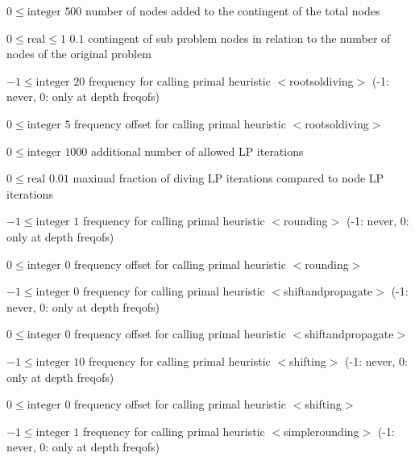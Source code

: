 %
{$0\leq\textrm{integer}$}%
{$500$}%
{number of nodes added to the contingent of the total nodes}%
{}

%
{$0\leq\textrm{real}\leq1$}%
{$0.1$}%
{contingent of sub problem nodes in relation to the number of nodes of the original problem}%
{}

%
{$-1\leq\textrm{integer}$}%
{$20$}%
{frequency for calling primal heuristic $<$rootsoldiving$>$ (-1: never, 0: only at depth freqofs)}%
{}

%
{$0\leq\textrm{integer}$}%
{$5$}%
{frequency offset for calling primal heuristic $<$rootsoldiving$>$}%
{}

%
{$0\leq\textrm{integer}$}%
{$1000$}%
{additional number of allowed LP iterations}%
{}

%
{$0\leq\textrm{real}$}%
{$0.01$}%
{maximal fraction of diving LP iterations compared to node LP iterations}%
{}

%
{$-1\leq\textrm{integer}$}%
{$1$}%
{frequency for calling primal heuristic $<$rounding$>$ (-1: never, 0: only at depth freqofs)}%
{}

%
{$0\leq\textrm{integer}$}%
{$0$}%
{frequency offset for calling primal heuristic $<$rounding$>$}%
{}

%
{$-1\leq\textrm{integer}$}%
{$0$}%
{frequency for calling primal heuristic $<$shiftandpropagate$>$ (-1: never, 0: only at depth freqofs)}%
{}

%
{$0\leq\textrm{integer}$}%
{$0$}%
{frequency offset for calling primal heuristic $<$shiftandpropagate$>$}%
{}

%
{$-1\leq\textrm{integer}$}%
{$10$}%
{frequency for calling primal heuristic $<$shifting$>$ (-1: never, 0: only at depth freqofs)}%
{}

%
{$0\leq\textrm{integer}$}%
{$0$}%
{frequency offset for calling primal heuristic $<$shifting$>$}%
{}

%
{$-1\leq\textrm{integer}$}%
{$1$}%
{frequency for calling primal heuristic $<$simplerounding$>$ (-1: never, 0: only at depth freqofs)}%
{}

